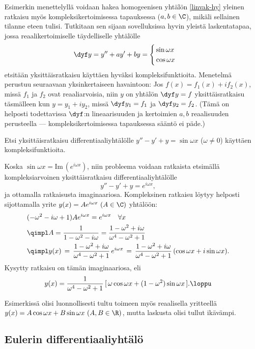 Esimerkin menettelyllä voidaan hakea homogeenisen yhtälön \eqref{linvak-hy} yleinen ratkaisu
myös kompleksikertoimisessa tapauksessa ($a,b\in\C$), mikäli sellainen tilanne eteen tulisi.
Tutkitaan sen sijaan sovelluksissa hyvin yleistä laskentatapaa, jossa reaalikertoimiselle
täydelliselle yhtälölle
\[
\dyf y = y''+ay'+by = \begin{cases} \,\sin\omega x \\ \,\cos\omega x \end{cases}
\]
etsitään yksittäisratkaisu käyttäen hyväksi kompleksifunktioita. Menetelmä perustuu seuraavaan
yksinkertaiseen havaintoon: Jos $f(x)=f_1(x)+if_2(x)$, missä $f_1$ ja $f_2$ ovat reaaliarvoisia,
niin $y$ on yhtälön $\dyf y=f$ yksittäisratkaisu täsmälleen kun $y=y_1+iy_2$, missä
$\dyf y_1=f_1$ ja $\dyf y_2=f_2$. (Tämä on helposti todettavissa $\dyf$:n lineaarisuuden ja
kertoimien $a,b$ reaalisuuden perusteella --- kompleksikertoimisessa tapauksessa sääntö ei 
päde.)
\begin{Exa} Etsi yksittäisratkaisu differentiaaliyhtälölle $y''-y'+y=\sin\omega x$ 
($\omega\neq 0$) käyttäen kompleksifunktioita.
\end{Exa}
\ratk Koska $\sin \omega x = \text{Im} \, (e^{i\omega x})$, niin probleema voidaan ratkaista
etsimällä kompleksiarvoinen yksittäisratkaisu differentiaaliyhtälölle
\[
y''-y'+y=e^{i\omega x},
\]
ja ottamalla ratkaisusta imaginaariosa. Kompleksinen ratkaisu löytyy helposti sijottamalla
yrite $y(x)=Ae^{i\omega x}\ (A\in\C)$ yhtälöön:
\begin{align*}
     &(-\omega^2-i\omega+1)Ae^{i\omega x}=e^{i\omega x}\quad\forall x \\
     &\qimpl A=\frac{1}{1-\omega^2-i\omega}=\frac{1-\omega^2+i\omega}{\omega^4-\omega^2+1} \\
     &\qimpl y(x) \,=\, \frac{1-\omega^2+i\omega}{\omega^4-\omega^2+1}\,e^{i\omega x}
          \,=\, \frac{1-\omega^2+i\omega}{\omega^4-\omega^2+1}\,(\cos\omega x + i\sin\omega x).
\end{align*}
Kysytty ratkaisu on tämän imaginaariosa, eli
\[
y(x)=\frac{1}{\omega^4-\omega^2+1}\,[\,\omega\cos\omega x + (1-\omega^2)\sin\omega x\,]. \loppu
\]

Esimerkissä olisi luonnollisesti tultu toimeen myös reaalisella yritteellä 
$y(x)=A\cos\omega x+B\sin\omega x\ (A,B\in\R)$, mutta laskusta olisi tullut ikävämpi.

\subsection{Eulerin differentiaaliyhtälö}

